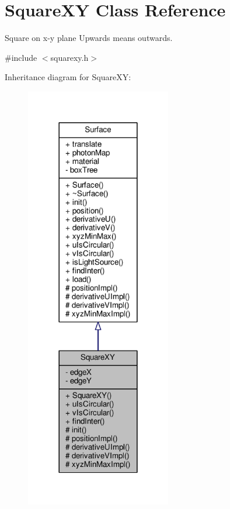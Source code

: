 \hypertarget{classSquareXY}{}\section{Square\+XY Class Reference}
\label{classSquareXY}


Square on x-\/y plane Upwards means outwards.  




{\ttfamily \#include $<$squarexy.\+h$>$}



Inheritance diagram for Square\+XY\+:
\nopagebreak
\begin{figure}[H]
\begin{center}
\leavevmode
\includegraphics[width=180pt]{classSquareXY__inherit__graph}
\end{center}
\end{figure}


